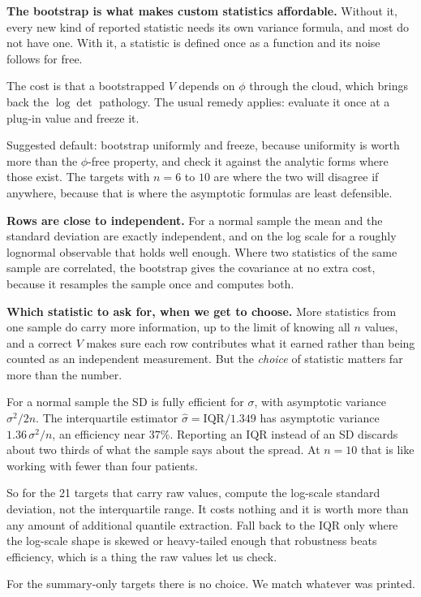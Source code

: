 \documentclass[11pt]{article}
\begin{document}
\begin{notebox}
\textbf{The bootstrap is what makes custom statistics affordable.} Without it,
every new kind of reported statistic needs its own variance formula, and most do
not have one. With it, a statistic is defined once as a function and its noise
follows for free.

The cost is that a bootstrapped $V$ depends on $\phi$ through the cloud, which
brings back the $\log\det$ pathology. The usual remedy applies: evaluate it once
at a plug-in value and freeze it.

Suggested default: bootstrap uniformly and freeze, because uniformity is worth
more than the $\phi$-free property, and check it against the analytic forms where
those exist. The targets with $n=6$ to $10$ are where the two will disagree if
anywhere, because that is where the asymptotic formulas are least defensible.
\end{notebox}

\textbf{Rows are close to independent.} For a normal sample the mean and the
standard deviation are exactly independent, and on the log scale for a roughly
lognormal observable that holds well enough. Where two statistics of the same
sample are correlated, the bootstrap gives the covariance at no extra cost,
because it resamples the sample once and computes both.

\begin{notebox}
\textbf{Which statistic to ask for, when we get to choose.} More statistics from
one sample do carry more information, up to the limit of knowing all $n$ values,
and a correct $V$ makes sure each row contributes what it earned rather than
being counted as an independent measurement. But the \emph{choice} of statistic
matters far more than the number.

For a normal sample the SD is fully efficient for $\sigma$, with asymptotic
variance $\sigma^2/2n$. The interquartile estimator
$\widehat\sigma=\mathrm{IQR}/1.349$ has asymptotic variance $1.36\,\sigma^2/n$,
an efficiency near $37\%$. Reporting an IQR instead of an SD discards about two
thirds of what the sample says about the spread. At $n=10$ that is like working
with fewer than four patients.

So for the 21 targets that carry raw values, compute the log-scale standard
deviation, not the interquartile range. It costs nothing and it is worth more
than any amount of additional quantile extraction. Fall back to the IQR only
where the log-scale shape is skewed or heavy-tailed enough that robustness beats
efficiency, which is a thing the raw values let us check.

For the summary-only targets there is no choice. We match whatever was printed.
\end{notebox}
\end{document}
